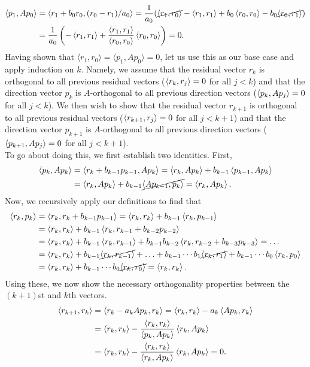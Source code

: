 \documentclass{article}
\begin{document}
\begin{align*}
\ip{p_1}{Ap_0}&=\ip{r_1+b_0r_0}{(r_0-r_1)/a_0}=\frac{1}{a_0}(\cancel{\ip{r_1}{r_0}}-\ip{r_1}{r_1}+b_0\ip{r_0}{r_0}-b_0\cancel{\ip{r_0}{r_1}})\\&=
\frac{1}{a_0}\left(-\ip{r_1}{r_1}+\frac{\ip{r_1}{r_1}}{\ip{r_0}{r_0}}\ip{r_0}{r_0}\right)=0.
\end{align*}
Having shown that $\langle r_1 , r_0 \rangle = \langle p_1 , A p_0 \rangle = 0$, let us use this as our base case and apply induction on $k$. Namely, we assume that the residual vector $r_k$ is orthogonal to all previous residual vectors ($\ip{r_k}{r_j}=0$ for all $j<k$) and that the direction vector $p_k$ is $A$-orthogonal to all previous direction vectors ($\ip{p_k}{Ap_j}=0$ for all $j<k$). We then wish to show that the residual vector $r_{k+1}$ is orthogonal to all previous residual vectors ($\ip{r_{k+1}}{r_j}=0$ for all $j<k+1$) and that the direction vector $p_{k+1}$ is $A$-orthogonal to all previous direction vectors ($\ip{p_{k+1}}{Ap_j}=0$ for all $j<k+1$). \\
To go about doing this, we first establish two identities. First,
\begin{align*}
\ip{p_k}{Ap_k}&=\ip{r_k+b_{k-1}p_{k-1}}{Ap_k}=\ip{r_k}{Ap_k}+b_{k-1}\ip{p_{k-1}}{Ap_k}\\&=
\ip{r_k}{Ap_k}+b_{k-1}\cancel{\ip{Ap_{k-1}}{p_k}}=\ip{r_k}{Ap_k}.
\end{align*}
Now, we recursively apply our definitions to find that
\begin{align*}
\ip{r_k}{p_k}&=\ip{r_k}{r_k+b_{k-1}p_{k-1}}=\ip{r_k}{r_k}+b_{k-1}\ip{r_k}{p_{k-1}}\\&=
\ip{r_k}{r_k}+b_{k-1}\ip{r_k}{r_{k-1}+b_{k-2}p_{k-2}}\\&=
\ip{r_k}{r_k}+b_{k-1}\ip{r_k}{r_{k-1}}+b_{k-1}b_{k-2}\ip{r_k}{r_{k-2}+b_{k-3}p_{k-3}}=\ldots\\&=
\ip{r_k}{r_k}+b_{k-1}\cancel{\ip{r_k}{r_{k-1}}}+\ldots+b_{k-1}\cdots b_1\cancel{\ip{r_k}{r_1}}+b_{k-1}\cdots b_0\ip{r_k}{p_0}\\&=
\ip{r_k}{r_k}+b_{k-1}\cdots b_0\cancel{\ip{r_k}{r_0}}=\ip{r_k}{r_k}.
\end{align*}
Using these, we now show the necessary orthogonality properties between the $(k+1)$st and $k$th vectors.
\begin{align*}
\ip{r_{k+1}}{r_k}&=\ip{r_k-a_kAp_k}{r_k}=\ip{r_k}{r_k}-a_k\ip{Ap_k}{r_k}\\&=
\ip{r_k}{r_k}-\frac{\ip{r_k}{r_k}}{\ip{p_{k}}{Ap_{k}}}\ip{r_k}{Ap_k}\\&=
\ip{r_k}{r_k}-\frac{\ip{r_k}{r_k}}{\ip{r_{k}}{Ap_{k}}}\ip{r_k}{Ap_k}=0.
\end{align*}
\end{document}
